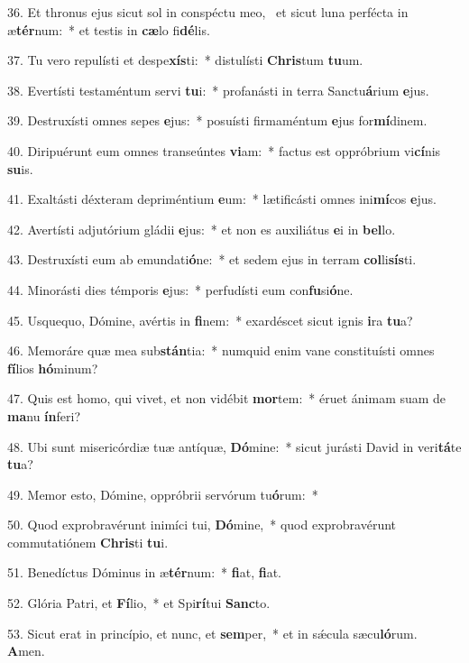 36. Et thronus ejus sicut sol in conspéctu meo, \dag\  et sicut luna perfécta in æ\textbf{tér}num:~*  et testis in \textbf{cæ}lo fi\textbf{dé}lis.\

37. Tu vero repulísti et despe\textbf{xís}ti:~*  distulísti \textbf{Chris}tum \textbf{tu}um.\

38. Evertísti testaméntum servi \textbf{tu}i:~*  profanásti in terra Sanctu\textbf{á}rium \textbf{e}jus.\

39. Destruxísti omnes sepes \textbf{e}jus:~*  posuísti firmaméntum \textbf{e}jus for\textbf{mí}dinem.\

40. Diripuérunt eum omnes transeúntes \textbf{vi}am:~*  factus est oppróbrium vi\textbf{cí}nis \textbf{su}is.\

41. Exaltásti déxteram depriméntium \textbf{e}um:~*  lætificásti omnes ini\textbf{mí}cos \textbf{e}jus.\

42. Avertísti adjutórium gládii \textbf{e}jus:~*  et non es auxiliátus \textbf{e}i in \textbf{bel}lo.\

43. Destruxísti eum ab emundati\textbf{ó}ne:~*  et sedem ejus in terram \textbf{col}li\textbf{sís}ti.\

44. Minorásti dies témporis \textbf{e}jus:~*  perfudísti eum con\textbf{fu}si\textbf{ó}ne.\

45. Usquequo, Dómine, avértis in \textbf{fi}nem:~*  exardéscet sicut ignis \textbf{i}ra \textbf{tu}a?\

46. Memoráre quæ mea sub\textbf{stán}tia:~*  numquid enim vane constituísti omnes \textbf{fí}lios \textbf{hó}minum?\

47. Quis est homo, qui vivet, et non vidébit \textbf{mor}tem:~*  éruet ánimam suam de \textbf{ma}nu \textbf{ín}feri?\

48. Ubi sunt misericórdiæ tuæ antíquæ, \textbf{Dó}mine:~*  sicut jurásti David in veri\textbf{tá}te \textbf{tu}a?\

49. Memor esto, Dómine, oppróbrii servórum tu\textbf{ó}rum:~*  \

50. Quod exprobravérunt inimíci tui, \textbf{Dó}mine,~*  quod exprobravérunt commutatiónem \textbf{Chris}ti \textbf{tu}i.\

51. Benedíctus Dóminus in æ\textbf{tér}num:~*  \textbf{fi}at, \textbf{fi}at.\

52. Glória Patri, et \textbf{Fí}lio,~*  et Spi\textbf{rí}tui \textbf{Sanc}to.\

53. Sicut erat in princípio, et nunc, et \textbf{sem}per,~*  et in sǽcula sæcu\textbf{ló}rum. \textbf{A}men.\

